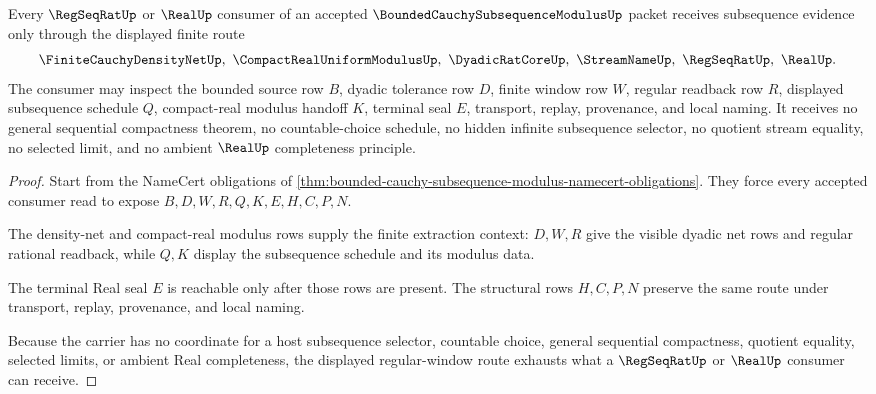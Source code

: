 \begin{theorem}
\label{thm:bounded-cauchy-subsequence-modulus-regular-window}
Every $\RegSeqRatUp$ or $\RealUp$ consumer of an accepted $\BoundedCauchySubsequenceModulusUp$ packet receives subsequence evidence only through the displayed finite route
$$
\FiniteCauchyDensityNetUp,\ \CompactRealUniformModulusUp,\ \DyadicRatCoreUp,\ \StreamNameUp,\ \RegSeqRatUp,\ \RealUp .
$$
The consumer may inspect the bounded source row $B$, dyadic tolerance row $D$, finite window row $W$, regular readback row $R$, displayed subsequence schedule $Q$, compact-real modulus handoff $K$, terminal seal $E$, transport, replay, provenance, and local naming. It receives no general sequential compactness theorem, no countable-choice schedule, no hidden infinite subsequence selector, no quotient stream equality, no selected limit, and no ambient $\RealUp$ completeness principle.
\end{theorem}
\begin{proof}
Start from the NameCert obligations of \autoref{thm:bounded-cauchy-subsequence-modulus-namecert-obligations}. They force every accepted consumer read to expose $B,D,W,R,Q,K,E,H,C,P,N$.

The density-net and compact-real modulus rows supply the finite extraction context: $D,W,R$ give the visible dyadic net rows and regular rational readback, while $Q,K$ display the subsequence schedule and its modulus data.

The terminal Real seal $E$ is reachable only after those rows are present. The structural rows $H,C,P,N$ preserve the same route under transport, replay, provenance, and local naming.

Because the carrier has no coordinate for a host subsequence selector, countable choice, general sequential compactness, quotient equality, selected limits, or ambient Real completeness, the displayed regular-window route exhausts what a $\RegSeqRatUp$ or $\RealUp$ consumer can receive.
\end{proof}


